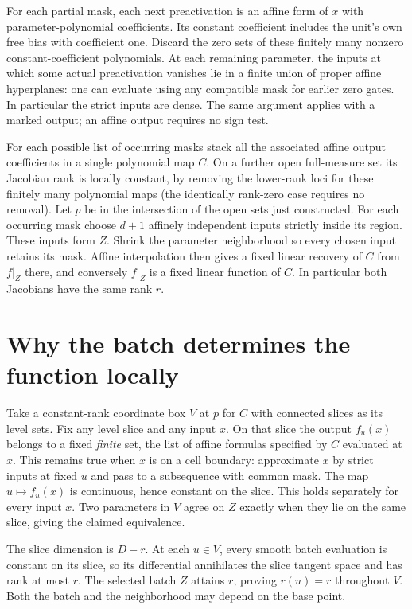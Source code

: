 \documentclass[10pt]{article}
\begin{document}
For each partial mask, each next preactivation is an affine form of $x$ with parameter-polynomial coefficients. Its constant coefficient includes the unit's own free bias with coefficient one. Discard the zero sets of these finitely many nonzero constant-coefficient polynomials. At each remaining parameter, the inputs at which some actual preactivation vanishes lie in a finite union of proper affine hyperplanes: one can evaluate using any compatible mask for earlier zero gates. In particular the strict inputs are dense. The same argument applies with a marked output; an affine output requires no sign test.

For each possible list of occurring masks stack all the associated affine output coefficients in a single polynomial map $C$. On a further open full-measure set its Jacobian rank is locally constant, by removing the lower-rank loci for these finitely many polynomial maps (the identically rank-zero case requires no removal). Let $p$ be in the intersection of the open sets just constructed. For each occurring mask choose $d+1$ affinely independent inputs strictly inside its region. These inputs form $Z$. Shrink the parameter neighborhood so every chosen input retains its mask. Affine interpolation then gives a fixed linear recovery of $C$ from $f|_Z$ there, and conversely $f|_Z$ is a fixed linear function of $C$. In particular both Jacobians have the same rank $r$.

\section*{Why the batch determines the function locally}
Take a constant-rank coordinate box $V$ at $p$ for $C$ with connected slices as its level sets. Fix any level slice and any input $x$. On that slice the output $f_u(x)$ belongs to a fixed \emph{finite} set, the list of affine formulas specified by $C$ evaluated at $x$. This remains true when $x$ is on a cell boundary: approximate $x$ by strict inputs at fixed $u$ and pass to a subsequence with common mask. The map $u\mapsto f_u(x)$ is continuous, hence constant on the slice. This holds separately for every input $x$. Two parameters in $V$ agree on $Z$ exactly when they lie on the same slice, giving the claimed equivalence.

The slice dimension is $D-r$. At each $u\in V$, every smooth batch evaluation is constant on its slice, so its differential annihilates the slice tangent space and has rank at most $r$. The selected batch $Z$ attains $r$, proving $r(u)=r$ throughout $V$. Both the batch and the neighborhood may depend on the base point.
\end{document}
